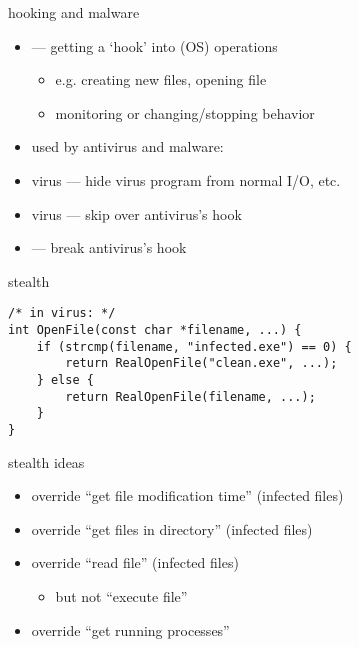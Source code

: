\begin{frame}[label=hookingReason]{hooking and malware}
    \begin{itemize}
    \item {} --- getting a `hook' into (OS) operations
        \begin{itemize}
        \item e.g. creating new files, opening file
        \item monitoring or changing/stopping behavior
        \end{itemize}
    \item used by antivirus and malware:
    \vspace{.5cm}
    \item {} virus --- hide virus program from normal I/O, etc.
    \item {} virus --- skip over antivirus's hook
    \item {} --- break antivirus's hook
    \end{itemize}
\end{frame}

\begin{frame}[fragile,label=stealth]{stealth}
\lstset{language=C,style=small}
\begin{lstlisting}
/* in virus: */
int OpenFile(const char *filename, ...) {
    if (strcmp(filename, "infected.exe") == 0) {
        return RealOpenFile("clean.exe", ...);
    } else {
        return RealOpenFile(filename, ...);
    }
}
\end{lstlisting}
\end{frame}

\begin{frame}{stealth ideas}
    \begin{itemize}
    \item override ``get file modification time'' (infected files)
    \item override ``get files in directory'' (infected files)
    \item override ``read file'' (infected files)
        \begin{itemize}
        \item but not ``execute file''
        \end{itemize}
    \item override ``get running processes'' 
    \end{itemize}
\end{frame}

